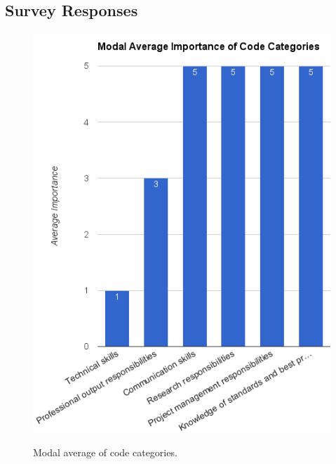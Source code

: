\documentclass{acm_proc_article-sp}
\begin{document}
\subsection{Survey Responses}
\begin{figure}[b!]
\centering
	\includegraphics[keepaspectratio, scale=0.4]{modal_average.png} 
	\label{Figure 3.}
	\caption{Modal average of code categories.}
\end{figure}
\end{document}
